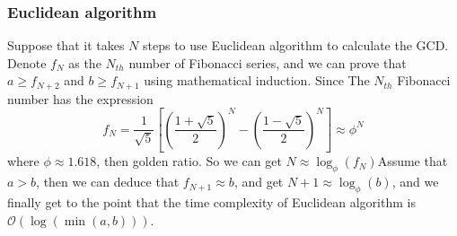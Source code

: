 \documentclass[catalog.tex]{subfiles}
\begin{document}
\subsubsection*{Euclidean algorithm}
Suppose that it takes $N$ steps to use Euclidean algorithm to calculate the GCD. Denote $f_N$ as the $N_{th}$ number of Fibonacci series, and we can prove that $a \geq f_{N+2}$ and $b \geq f_{N+1}$ using mathematical induction. Since The $N_{th}$ Fibonacci number has the expression
$$f_N = \frac{1}{\sqrt{5}}[(\frac{1+\sqrt{5}}{2})^N - (\frac{1-\sqrt{5}}{2})^N] \approx \phi^N$$
where $\phi \approx 1.618$, then golden ratio. So we can get $N \approx \log_\phi(f_N)$Assume that $a>b$, then we can deduce that $f_{N+1} \approx b$, and get $N+1 \approx \log_\phi(b)$, and we finally get to the point that the time complexity of Euclidean algorithm is $\mathcal{O}(\log(\min(a, b)))$.

\begin{Algorithm}[Euclidean\label{alg:\currfilebase_a}]
	\BlankLine

\end{Algorithm}


\singlespacing
\printbibliography[title={References.},resetnumbers=true,heading=subbibliography]
\end{document}
